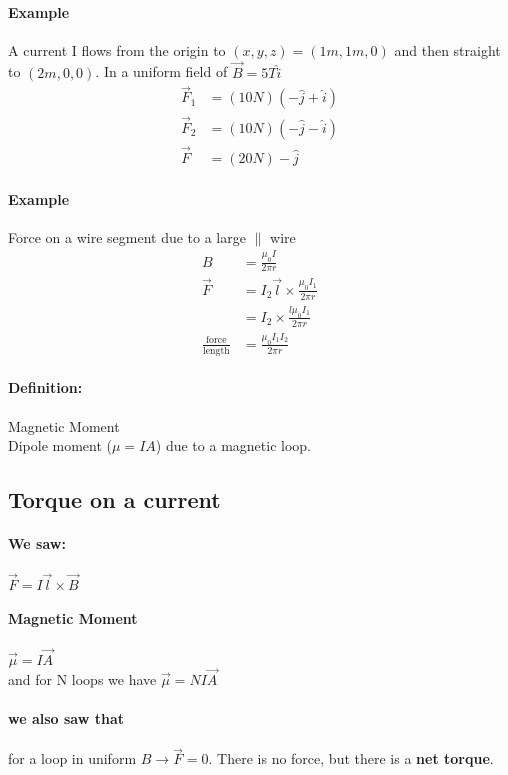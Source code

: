 \documentclass{article}
\begin{document}
    \paragraph{Example} A current I flows from the origin to $(x,y,z) = (1m,1m,0)$ and then straight to $(2m,0,0)$. In a uniform field of $\vec{B} = 5T\hat{i}$
    \begin{align*}
        \vec{F}_1 &= (10N)(-\hat{j} + \hat{i})\\
        \vec{F}_2 &= (10N)(-\hat{j}-\hat{i})\\
        \vec{F} &= (20N)-\hat{j}
    \end{align*}

    \paragraph{Example} Force on a wire segment due to a large $\parallel$ wire
    \begin{align*}
        B &= \frac{\mu_0 I}{2\pi r}\\
        \vec{F} &= I_2\vec{l}\times \frac{\mu_0 I_1}{2\pi r}\\
        &= I_2\times \frac{l \mu_0 I_1}{2\pi r}\\
        \frac{\text{force}}{\text{length}} &= \frac{\mu_0 I_1 I_2}{2\pi r}
    \end{align*}
    \paragraph{Definition:}Magnetic Moment\\
    Dipole moment ($\mu = IA$) due to a magnetic loop.
    \subsection{Torque on a current}
    \paragraph{We saw:} $\vec{F} = I\vec{l}\times \vec{B}$
    \paragraph{Magnetic Moment} $\vec{\mu} = I\vec{A}$\\
    and for N loops we have $\vec{\mu} = NI\vec{A}$
    \paragraph{we also saw that}for a loop in uniform $B \rightarrow \vec{F} = 0$. 
    There is no force, but there is a \textbf{net torque}.
\end{document}
